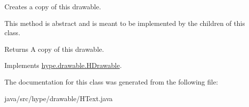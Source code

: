 Creates a copy of this drawable. 

This method is abstract and is meant to be implemented by the children of this class.

\begin{DoxyReturn}{Returns}
A copy of this drawable. 
\end{DoxyReturn}


Implements \hyperlink{classhype_1_1drawable_1_1_h_drawable_a9664f945675efa02d30228ca27d5819d}{hype.\-drawable.\-H\-Drawable}.



The documentation for this class was generated from the following file\-:\begin{DoxyCompactItemize}
\item 
java/src/hype/drawable/H\-Text.\-java\end{DoxyCompactItemize}

